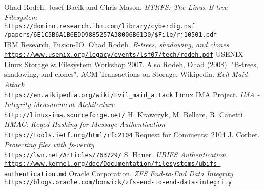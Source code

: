 \documentclass[10pt]{article}
\begin{document}
\begin{thebibliography}{9}
	Ohad Rodeh, Josef Bacik and Chris Mason.
	\textit{BTRFS: The Linux B-tree Filesystem}
	\\\texttt{https://domino.research.ibm.com/library/cyberdig.nsf\\/papers/6E1C5B6A1B6EDD9885257A38006B6130/\$File/rj10501.pdf}
	\\IBM Research, Fusion-IO.
	Ohad Rodeh.
	\textit{B-trees, shadowing, and clones}
	\\\texttt{\href{https://www.usenix.org/legacy/events/lsf07/tech/rodeh.pdf}{https://www.usenix.org/legacy/events/lsf07/tech/rodeh.pdf}}
	USENIX Linux Storage \& Filesystem Workshop 2007. Also Rodeh, Ohad (2008). "B-trees, shadowing, and clones". ACM Transactions on Storage.
	Wikipedia.
	\textit{Evil Maid Attack}
	\\\texttt{\href{https://en.wikipedia.org/wiki/Evil\_maid\_attack}{https://en.wikipedia.org/wiki/Evil\_maid\_attack}}
	Linux IMA Project.
	\textit{IMA - Integrity Measurement Atchitecture}
	\\\texttt{\href{http://linux-ima.sourceforge.net/}{http://linux-ima.sourceforge.net/}}
	H. Krawczyk, M. Bellare, R. Canetti
	\textit{HMAC: Keyed-Hashing for Message Authentication}
	\\\texttt{\href{https://tools.ietf.org/html/rfc2104}{https://tools.ietf.org/html/rfc2104}}
	Request for Comments: 2104 	
	J. Corbet.
	\textit{Protecting files with fs-verity}
	\\\texttt{\href{https://lwn.net/Articles/763729/}{https://lwn.net/Articles/763729/}}
	S. Hauer.
	\textit{UBIFS Authentication}
	\\\texttt{\href{https://www.kernel.org/doc/Documentation/filesystems/ubifs-authentication.md}{https://www.kernel.org/doc/Documentation/filesystems/ubifs-authentication.md}}
	Oracle Corporation.
	\textit{ZFS End-to-End Data Integrity}
	\\\texttt{\href{https://blogs.oracle.com/bonwick/zfs-end-to-end-data-integrity}{https://blogs.oracle.com/bonwick/zfs-end-to-end-data-integrity}}
\end{thebibliography}
\end{document}
